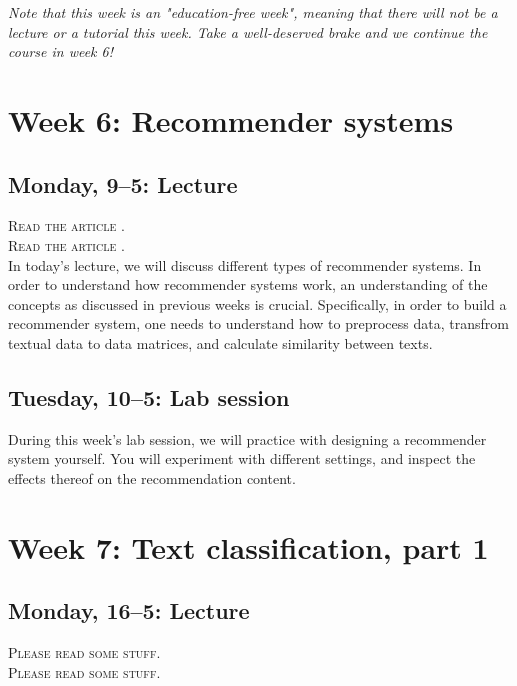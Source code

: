 \emph{Note that this week is an "education-free week", meaning that there will not be a lecture or a tutorial this week. Take a well-deserved brake and we continue the course in week 6!}

\section*{Week 6: Recommender systems}

\subsection*{Monday, 9--5: Lecture}
\textsc{ Read the article \cite{Moller2018}.}\\
\textsc{ Read the article \cite{Loecherbach2020}.}\\
In today's lecture, we will discuss different types of recommender systems. In order to understand how recommender systems work, an understanding of the concepts as discussed in previous weeks is crucial. Specifically, in order to build a recommender system, one needs to understand how to preprocess data, transfrom textual data to data matrices, and calculate similarity between texts. 

\subsection*{Tuesday, 10--5: Lab session}
During this week's lab session, we will practice with designing a recommender system yourself. You will experiment with different settings, and inspect the effects thereof on the recommendation content. 

\section*{Week 7: Text classification, part 1}
\subsection*{Monday, 16--5: Lecture}
\textsc{ Please read some stuff.}\\
\textsc{ Please read some stuff.}\\

\begin{itemize}
	\item{Watch: \url{https://www.youtube.com/watch?v=81vTqTz2pbM}
		\item{Read \cite{van_zoonen_social_2016}}
	\end{itemize}


